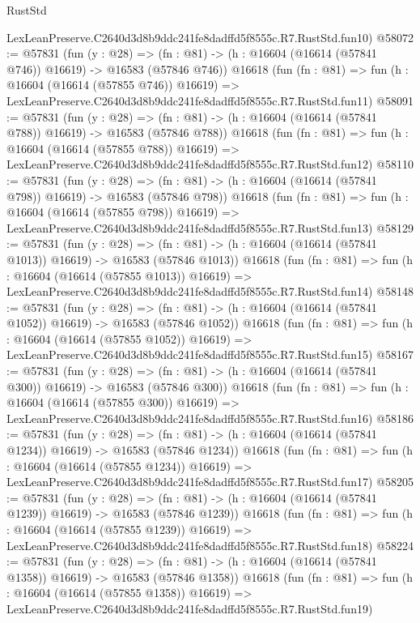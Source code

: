 \begin{lexlean}{RustStd}
\begin{coremodule}
    LexLeanPreserve.C2640d3d8b9ddc241fe8dadffd5f8555c.R7.RustStd.fun10)
@58072 := @57831
    (fun (y : @28) =>
    (fn : @81) -> (h : @16604 (@16614 (@57841 @746)) @16619) -> @16583 (@57846 @746))
    @16618
    (fun (fn : @81) =>
    fun (h : @16604 (@16614 (@57855 @746)) @16619) =>
    LexLeanPreserve.C2640d3d8b9ddc241fe8dadffd5f8555c.R7.RustStd.fun11)
@58091 := @57831
    (fun (y : @28) =>
    (fn : @81) -> (h : @16604 (@16614 (@57841 @788)) @16619) -> @16583 (@57846 @788))
    @16618
    (fun (fn : @81) =>
    fun (h : @16604 (@16614 (@57855 @788)) @16619) =>
    LexLeanPreserve.C2640d3d8b9ddc241fe8dadffd5f8555c.R7.RustStd.fun12)
@58110 := @57831
    (fun (y : @28) =>
    (fn : @81) -> (h : @16604 (@16614 (@57841 @798)) @16619) -> @16583 (@57846 @798))
    @16618
    (fun (fn : @81) =>
    fun (h : @16604 (@16614 (@57855 @798)) @16619) =>
    LexLeanPreserve.C2640d3d8b9ddc241fe8dadffd5f8555c.R7.RustStd.fun13)
@58129 := @57831
    (fun (y : @28) =>
    (fn : @81) -> (h : @16604 (@16614 (@57841 @1013)) @16619) -> @16583 (@57846 @1013))
    @16618
    (fun (fn : @81) =>
    fun (h : @16604 (@16614 (@57855 @1013)) @16619) =>
    LexLeanPreserve.C2640d3d8b9ddc241fe8dadffd5f8555c.R7.RustStd.fun14)
@58148 := @57831
    (fun (y : @28) =>
    (fn : @81) -> (h : @16604 (@16614 (@57841 @1052)) @16619) -> @16583 (@57846 @1052))
    @16618
    (fun (fn : @81) =>
    fun (h : @16604 (@16614 (@57855 @1052)) @16619) =>
    LexLeanPreserve.C2640d3d8b9ddc241fe8dadffd5f8555c.R7.RustStd.fun15)
@58167 := @57831
    (fun (y : @28) =>
    (fn : @81) -> (h : @16604 (@16614 (@57841 @300)) @16619) -> @16583 (@57846 @300))
    @16618
    (fun (fn : @81) =>
    fun (h : @16604 (@16614 (@57855 @300)) @16619) =>
    LexLeanPreserve.C2640d3d8b9ddc241fe8dadffd5f8555c.R7.RustStd.fun16)
@58186 := @57831
    (fun (y : @28) =>
    (fn : @81) -> (h : @16604 (@16614 (@57841 @1234)) @16619) -> @16583 (@57846 @1234))
    @16618
    (fun (fn : @81) =>
    fun (h : @16604 (@16614 (@57855 @1234)) @16619) =>
    LexLeanPreserve.C2640d3d8b9ddc241fe8dadffd5f8555c.R7.RustStd.fun17)
@58205 := @57831
    (fun (y : @28) =>
    (fn : @81) -> (h : @16604 (@16614 (@57841 @1239)) @16619) -> @16583 (@57846 @1239))
    @16618
    (fun (fn : @81) =>
    fun (h : @16604 (@16614 (@57855 @1239)) @16619) =>
    LexLeanPreserve.C2640d3d8b9ddc241fe8dadffd5f8555c.R7.RustStd.fun18)
@58224 := @57831
    (fun (y : @28) =>
    (fn : @81) -> (h : @16604 (@16614 (@57841 @1358)) @16619) -> @16583 (@57846 @1358))
    @16618
    (fun (fn : @81) =>
    fun (h : @16604 (@16614 (@57855 @1358)) @16619) =>
    LexLeanPreserve.C2640d3d8b9ddc241fe8dadffd5f8555c.R7.RustStd.fun19)

\end{coremodule}
\end{lexlean}
